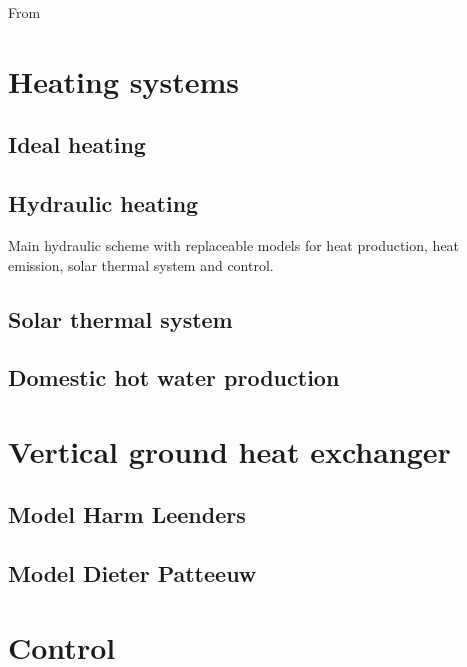 From ~\cite{Koschenz2000}

\section{Heating systems}

\subsection{Ideal heating}

\subsection{Hydraulic heating}

Main hydraulic scheme with replaceable models for heat production, heat emission, solar thermal system and control.

\subsection{Solar thermal system}

\subsection{Domestic hot water production}

\section{Vertical ground heat exchanger}

\subsection{Model Harm Leenders}

\subsection{Model Dieter Patteeuw}

\section{Control}


%









